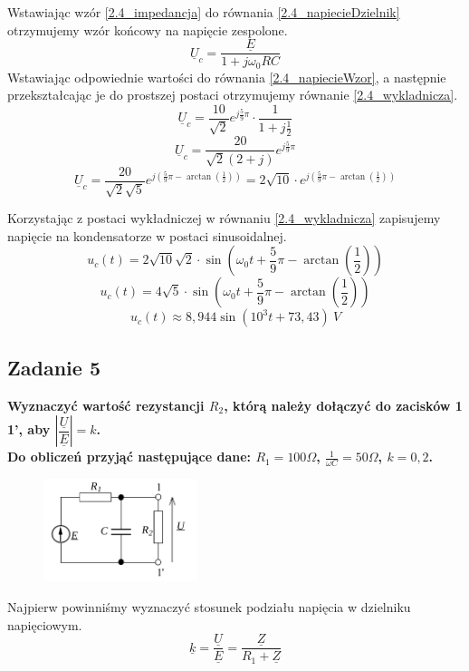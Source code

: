 \documentclass[12pt, a4paper]{article}
\begin{document}
Wstawiając wzór \ref{2.4_impedancja} do równania \ref{2.4_napiecieDzielnik}
otrzymujemy wzór końcowy na napięcie zespolone.
\begin{equation}\label{2.4_napiecieWzor}
  \underline{U}_c = \frac{\underline{E}}{1+j\omega_0 RC}
\end{equation}
Wstawiając odpowiednie wartości do równania \ref{2.4_napiecieWzor}, a następnie
przekształcając je do prostszej postaci otrzymujemy równanie \ref{2.4_wykladnicza}.
$$
  \underline{U}_c = \frac{10}{\sqrt{2}}e^{j\frac{5}{9}\pi} \cdot
  \frac{1}{1+j\frac{1}{2}}
$$
$$
  \underline{U}_c = \frac{20}{\sqrt{2}(2+j)}e^{j\frac{5}{9}\pi}
$$
\begin{equation}\label{2.4_wykladnicza}
  \underline{U}_c = \frac{20}{\sqrt{2}\sqrt{5}}e^{j\left(\frac{5}{9}\pi-\arctan
  \left(\frac{1}{2}\right)\right)} =
  2\sqrt{10}\cdot e^{j\left(\frac{5}{9}\pi-\arctan\left(\frac{1}{2}\right)\right)}
\end{equation}

Korzystając z postaci wykładniczej w równaniu \ref{2.4_wykladnicza} zapisujemy
napięcie na kondensatorze w postaci sinusoidalnej.
$$
  u_c(t) = 2\sqrt{10}\sqrt{2}\cdot\sin\left(\omega_0t+\frac{5}{9}\pi-
  \arctan\left(\frac{1}{2}\right)\right)
$$
$$
  u_c(t) = 4\sqrt{5}\cdot\sin\left(\omega_0t+\frac{5}{9}\pi-
  \arctan\left(\frac{1}{2}\right)\right)
$$
$$
  u_c(t) \approx 8,944\sin\left(10^3t+73,43\right)\: V
$$

\subsection{Zadanie 5}
\textbf{Wyznaczyć wartość rezystancji $R_2$, którą należy dołączyć do zacisków
  1 1’, aby $\left|\dfrac{\underline{U}}{\underline{E}}\right| = k$.\\
  Do obliczeń przyjąć następujące dane: $R_1 = 100\Omega$, $\frac{1}{\omega C} =
    50\Omega$, $k=0,2$.}
\begin{figure}[H]
  \centering
  \includegraphics[width = 0.4\textwidth]{./images/Lista_2/Zadanie_5.png}
\end{figure}

Najpierw powinniśmy wyznaczyć stosunek podziału napięcia w dzielniku
napięciowym.
\begin{equation}\label{2.5_dzielnik}
  \underline{k} = \frac{\underline{U}}{\underline{E}} = \frac{\underline{Z}}
  {R_1+\underline{Z}}
\end{equation}
\end{document}
